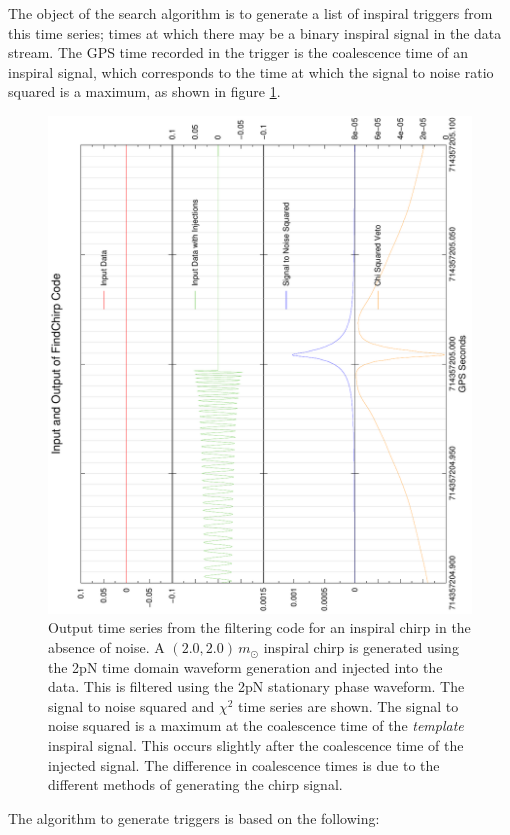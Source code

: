 The object of the search algorithm is to generate a list of inspiral triggers
from this time series; times at which there may be a binary inspiral signal in
the data stream. The GPS time recorded in the trigger is the coalescence time of
an inspiral signal, which corresponds to the time at which the signal to noise
ratio squared is a maximum, as shown in figure
\ref{f:zero_inject_zoom}.
\begin{figure}[htp]
\begin{center}
\includegraphics[angle=-90,width=0.75\linewidth]{zero_inject_zoom}
\end{center}
\caption{\label{f:zero_inject_zoom}Output time series from the filtering code
for an inspiral chirp in the absence of noise. A $(2.0,2.0)\,m_\odot$ inspiral
chirp is generated using the 2pN time domain waveform generation and injected
into the data. This is filtered using the 2pN stationary phase waveform. The
signal to noise squared and $\chi^2$ time series are shown.  The signal to
noise squared is a maximum at the coalescence time of the \textit{template}
inspiral signal. This occurs slightly after the coalescence time of the
injected signal. The difference in coalescence times is due to the different
methods of generating the chirp signal.
}
\end{figure}
The algorithm to generate triggers is based on the following:
